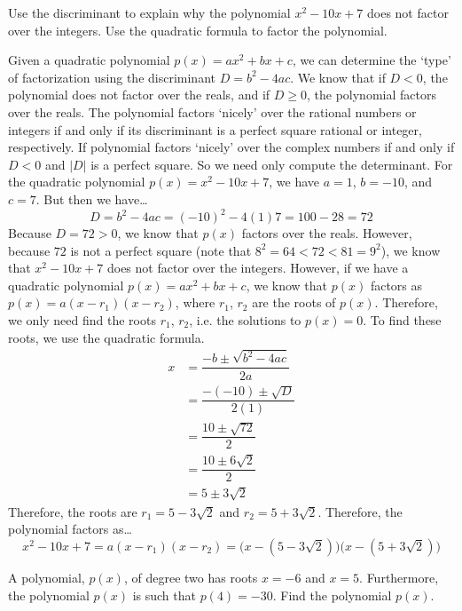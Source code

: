 \documentclass[12pt,letterpaper]{exam}
\begin{document}
\begin{questions}
\newpage
\question[10] Use the discriminant to explain why the polynomial $x^2 - 10x + 7$ does not factor over the integers. Use the quadratic formula to factor the polynomial. \pspace

\sol Given a quadratic polynomial $p(x)= ax^2 + bx + c$, we can determine the `type' of factorization using the discriminant $D= b^2 - 4ac$. We know that if $D < 0$, the polynomial does not factor over the reals, and if $D \geq 0$, the polynomial factors over the reals. The polynomial factors `nicely' over the rational numbers or integers if and only if its discriminant is a perfect square rational or integer, respectively. If polynomial factors `nicely' over the complex numbers if and only if $D < 0$ and $|D|$ is a perfect square. So we need only compute the determinant. For the quadratic polynomial $p(x)= x^2 - 10x + 7$, we have $a= 1$, $b= -10$, and $c= 7$. But then we have\dots
	\[
	D= b^2 - 4ac= (-10)^2 - 4(1)7= 100 - 28= 72
	\]
Because $D= 72 > 0$, we know that $p(x)$ factors over the reals. However, because $72$ is not a perfect square (note that $8^2= 64 < 72 < 81= 9^2$), we know that $x^2 - 10x + 7$ does not factor over the integers. However, if we have a quadratic polynomial $p(x)= ax^2 + bx + c$, we know that $p(x)$ factors as $p(x)= a(x - r_1)(x - r_2)$, where $r_1$, $r_2$ are the roots of $p(x)$. Therefore, we only need find the roots $r_1$, $r_2$, i.e. the solutions to $p(x)= 0$. To find these roots, we use the quadratic formula.
	\[
	\begin{aligned}
	x&= \dfrac{-b \pm \sqrt{b^2 - 4ac}}{2a} \\[0.3cm]
	&= \dfrac{-(-10) \pm \sqrt{D}}{2(1)} \\[0.3cm]
	&= \dfrac{10 \pm \sqrt{72}}{2} \\[0.3cm]
	&= \dfrac{10 \pm 6 \sqrt{2}}{2} \\[0.3cm]
	&= 5 \pm 3 \sqrt{2}
	\end{aligned}
	\]
Therefore, the roots are $r_1= 5 - 3 \sqrt{2}$ and $r_2= 5 + 3\sqrt{2}$. Therefore, the polynomial factors as\dots
	\[
	x^2 - 10x + 7= a(x - r_1)(x - r_2)= \big(x - (5 - 3 \sqrt{2}) \big) \big(x - (5 + 3 \sqrt{2}) \big)
	\]



\newpage
\question[10] A polynomial, $p(x)$, of degree two has roots $x= -6$ and $x= 5$. Furthermore, the polynomial $p(x)$ is such that $p(4)= -30$. Find the polynomial $p(x)$. \pspace


\end{questions}
\end{document}

